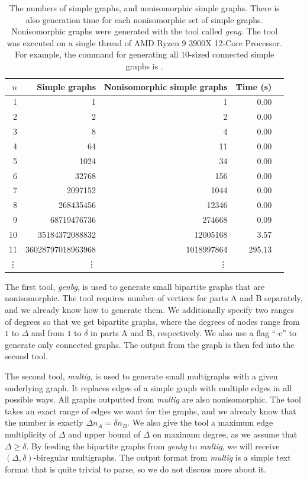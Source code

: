 \begin{table}[H]
  \centering
  \begin{tabular}{r|r|rrr}
    \toprule
    $n$&Simple graphs & Nonisomorphic simple graphs & Time (s)\\
    \midrule
    1  &1                 & 1 & 0.00\\
    2  &2                 & 2 & 0.00\\
    3  &8                 & 4 & 0.00\\
    4  &64                & 11 & 0.00\\
    5  &1024              & 34 & 0.00\\
    6  &32768             & 156 & 0.00\\
    7  &2097152           & 1044 & 0.00\\
    8  &268435456         & 12346 & 0.00\\
    9  &68719476736       & 274668   & 0.09\\
    10 &35184372088832    & 12005168 & 3.57\\
    11 &36028797018963968 &1018997864&295.13\\
    \vdots & \vdots &\vdots\\
    \bottomrule
  \end{tabular}
  \caption{%
    The numbers of simple graphs, and nonisomorphic simple graphs.
    There is also generation time for each nonisomorphic set of simple graphs.
    Nonisomorphic graphs were generated with the tool called \emph{geng}.
    The tool was executed on a single thread of AMD Ryzen 9 3900X 12-Core Processor.
    For example, the command for generating all 10-sized connected simple graphs is .
  }
  \label{tbl:graph_count_nonisomorphic}
\end{table}

The first tool, \emph{genbg}, is used to generate small bipartite graphs that are nonisomorphic.
The tool requires number of vertices for parts A and B separately, and we already know how to generate them.
We additionally specify two ranges of degrees so that we get bipartite graphs, where the degrees of nodes range from $1$ to $\Delta$ and from $1$ to $\delta$ in parts A and B, respectively.
We also use a flag ``-c'' to generate only connected graphs.
The output from the graph is then fed into the second tool.

The second tool, \emph{multig}, is used to generate small multigraphs with a given underlying graph.
It replaces edges of a simple graph with multiple edges in all possible ways.
All graphs outputted from \emph{multig} are also nonisomorphic.
The tool takes an exact range of edges we want for the graphs, and we already know that the number is exactly $\Delta n_A = \delta n_B$.
We also give the tool a maximum edge multiplicity of $\Delta$ and upper bound of $\Delta$ on maximum degree, as we assume that $\Delta \geq \delta$.
By feeding the bipartite graphs from \emph{genbg} to \emph{multig}, we will receive $(\Delta, \delta)$-biregular multigraphs.
The output format from \emph{multig} is a simple text format that is quite trivial to parse, so we do not discuss more about it.

